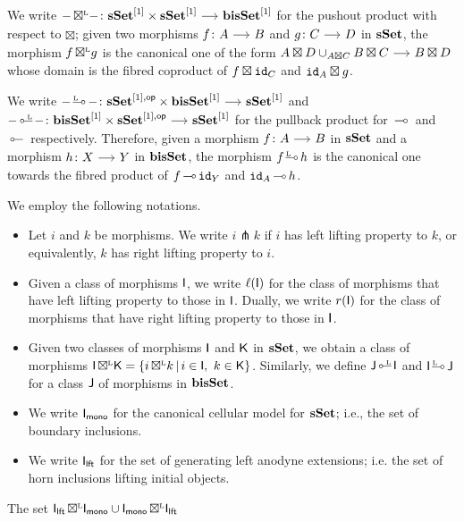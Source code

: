 \documentclass[a4paper,  dvipsnames, 11pt]{amsart}
\begin{document}
\begin{definition}
	We write $-\boxtimesL-\colon\sSet^\ra\times\sSet^\ra\arr\bisSet^\ra$ for the pushout product with respect to $\boxtimes$;
	given two morphisms $f\colon A\arr B$ and $g\colon C\arr D$ in $\mathbf{sSet}$, the morphism $f{\mathrel{\,\boxtimes^{\text{\tiny{L}}}}} g$ is the canonical one of the form
	$A\boxtimes D \cup_{A\boxtimes C} B\boxtimes C\arr B\boxtimes D$ whose domain is the fibred coproduct of $f\boxtimes \mathtt{id}_{C}$ and $\mathtt{id}_{A}\boxtimes g$.
\end{definition}
\begin{definition}
	We write
	$-\rollipopL-\colon\sSet^{\ra,\op}\times\bisSet^\ra\arr\sSet^\ra$
	and
	$-\lollipopL-\colon\bisSet^\ra\times\sSet^{\ra,\op}\arr\sSet^\ra$
	for the pullback product for $\rollipop$ and $\lollipop$ respectively.
	Therefore, given a morphism $f\colon A \arr B$ in $\mathbf{sSet}$ and a morphism $h\colon X\arr Y$ in $\mathbf{bisSet}$,
	the morphism
	$f\rollipopL h$ is the canonical one towards the fibred product of $f\rollipop \id_Y$ and $\id_A\rollipop h$.
\end{definition}
\begin{notation}
	We employ the following notations.
	\begin{itemize}
		\item %
			Let $i$ and $k$ be morphisms.
			We write $i\pitchfork k$ if $i$ has left lifting property to $k$, or equivalently,
			$k$ has right lifting property to $i$.
		\item %
			Given a class of morphisms $\mathsf{I}$,
			we write $\ell(\mathsf{I})$ for the class of morphisms that have left lifting property to those in $\mathsf{I}$.
			Dually, we write $r(\mathsf{I})$ for the class of morphisms that have right lifting property to those in $\mathsf{I}$.
		\item %
			Given two classes of morphisms $\mathsf{I}$ and $\mathsf{K}$ in $\mathbf{sSet}$,
			we obtain a class of morphisms $\mathsf{I}{\mathrel{\,\boxtimes^{\text{\tiny{L}}}}}\mathsf{K}=\{ i{\mathrel{\,\boxtimes^{\text{\tiny{L}}}}} k\,|\,i\in\mathsf{I},\ k\in\mathsf{K} \}$.
			Similarly, we define $\J\lollipopL\I$ and $\I\rollipopL\J$ for a class $\mathsf{J}$ of morphisms in $\mathbf{bisSet}$.
		\item %
			We write $\mathsf{I}_{\mathsf{mono}}$ for the canonical cellular model for $\mathbf{sSet}$; i.e., the set of boundary inclusions.
		\item %
			We write $\mathsf{I}_{\mathsf{lft}}$ for the set of generating left anodyne extensions; i.e. the set of horn inclusions lifting initial objects.
		\qedhere %
	\end{itemize}
\end{notation}
The set
$\mathsf{I}_{\mathsf{lft}}{\mathrel{\,\boxtimes^{\text{\tiny{L}}}}}\mathsf{I}_{\mathsf{mono}}\cup\mathsf{I}_{\mathsf{mono}}{\mathrel{\,\boxtimes^{\text{\tiny{L}}}}}\mathsf{I}_{\mathsf{lft}}$
\end{document}
